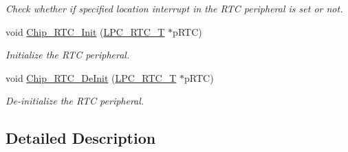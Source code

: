 \begin{DoxyCompactItemize}
\begin{DoxyCompactList}\small\item\em Check whether if specified location interrupt in the R\+T\+C peripheral is set or not. \end{DoxyCompactList}\item 
void \hyperlink{group___r_t_c__17_x_x__40_x_x_gac37fe41fed088f1336797e05674125ff}{Chip\+\_\+\+R\+T\+C\+\_\+\+Init} (\hyperlink{struct_l_p_c___r_t_c___t}{L\+P\+C\+\_\+\+R\+T\+C\+\_\+\+T} $\ast$p\+R\+T\+C)
\begin{DoxyCompactList}\small\item\em Initialize the R\+T\+C peripheral. \end{DoxyCompactList}\item 
void \hyperlink{group___r_t_c__17_x_x__40_x_x_ga63cc16f1c4b72523e0e67a6c651f0026}{Chip\+\_\+\+R\+T\+C\+\_\+\+De\+Init} (\hyperlink{struct_l_p_c___r_t_c___t}{L\+P\+C\+\_\+\+R\+T\+C\+\_\+\+T} $\ast$p\+R\+T\+C)
\begin{DoxyCompactList}\small\item\em De-\/initialize the R\+T\+C peripheral. \end{DoxyCompactList}\end{DoxyCompactItemize}


\subsection{Detailed Description}


